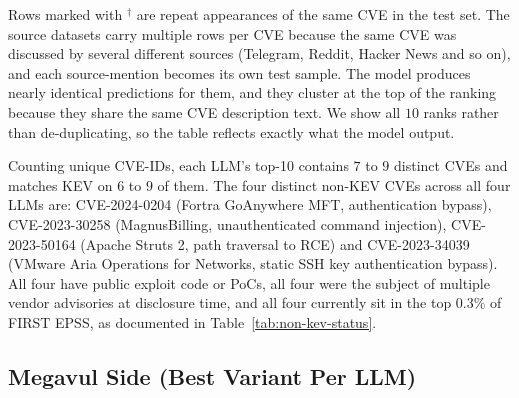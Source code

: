 \documentclass[11pt]{article}
\begin{document}
Rows marked with $^{\dagger}$ are repeat appearances of the same CVE
in the test set. The source datasets carry multiple rows per CVE
because the same CVE was discussed by several different sources
(Telegram, Reddit, Hacker News and so on), and each source-mention
becomes its own test sample. The model produces nearly identical
predictions for them, and they cluster at the top of the ranking
because they share the same CVE description text. We show all $10$
ranks rather than de-duplicating, so the table reflects exactly what
the model output.

Counting unique CVE-IDs, each LLM's top-10 contains $7$ to $9$
distinct CVEs and matches KEV on $6$ to $9$ of them. The four
distinct non-KEV CVEs across all four LLMs are: CVE-2024-0204
(Fortra GoAnywhere MFT, authentication bypass),
CVE-2023-30258 (MagnusBilling, unauthenticated command injection),
CVE-2023-50164 (Apache Struts 2, path traversal to RCE) and
CVE-2023-34039 (VMware Aria Operations for Networks, static SSH key
authentication bypass). All four have public exploit code or PoCs,
all four were the subject of multiple vendor advisories at disclosure
time, and all four currently sit in the top $0.3\%$ of FIRST EPSS, as
documented in Table~\ref{tab:non-kev-status}.

\subsection{Megavul Side (Best Variant Per LLM)}
\end{document}

